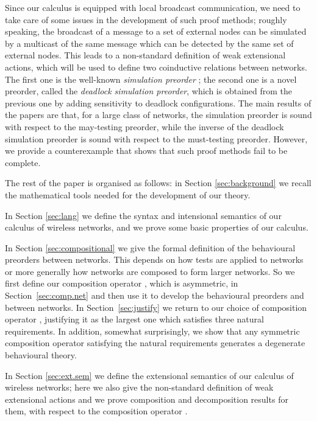 \documentclass{LMCS}
\begin{document}
Since our calculus is equipped with local broadcast communication, 
we need to take care of some issues in the development of such proof 
methods; roughly speaking, the broadcast of a message to a 
set of external nodes can be simulated by a multicast of the same message 
which can be detected by the same set of external nodes. This leads 
to a non-standard definition of weak extensional actions, which will 
be used to define two coinductive relations between networks. The first one 
is the well-known \emph{simulation preorder} \cite{DGHM09full}; the second 
one is a novel preorder, called the \emph{deadlock simulation preorder}, 
which is obtained from the previous one by adding sensitivity to deadlock 
configurations. 
The main results of the papers are that, for a large class of networks, 
the simulation preorder is sound with respect to the may-testing preorder, 
while the inverse of the deadlock simulation preorder is sound with 
respect to the must-testing preorder. However, we provide a 
counterexample that shows that such proof methods fail 
to be complete.

The rest of the paper is organised as follows: 
in Section \ref{sec:background} we recall the mathematical 
tools needed for the development of our theory. 

In Section \ref{sec:lang} we define the syntax and intensional 
semantics of our calculus of wireless networks, and we prove 
some basic properties of our calculus. 

 In Section \ref{sec:compositional} we give the formal definition
  of the behavioural preorders between networks. This depends on how tests
  are applied to networks or more generally how networks are composed
  to form larger networks.  So we first define our composition
  operator , which is asymmetric, in
  Section~\ref{sec:comp.net} and then use it to develop the
  behavioural preorders  and  between networks. In
  Section~\ref{sec:justify} we return to our choice of composition
  operator , justifying it as the largest one which satisfies 
  three natural requirements. In addition, somewhat surprisingly, we show
  that any symmetric composition operator satisfying the natural requirements
  generates a degenerate behavioural theory. 

In Section \ref{sec:ext.sem} we define the extensional semantics of 
our calculus of wireless networks; here we also give the non-standard 
definition of weak extensional actions and we prove composition and 
decomposition results for them, with respect to the composition operator 
.
\end{document}
